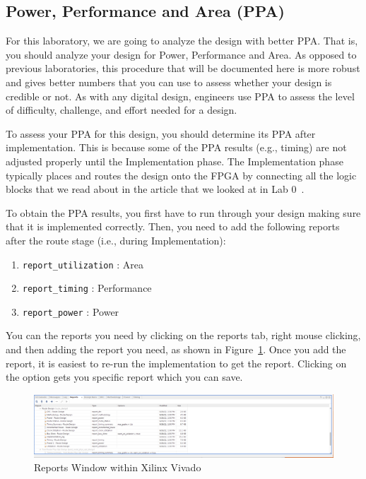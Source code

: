 \documentclass{article}
\begin{document}
\subsection{Power, Performance and Area (PPA)}

For this laboratory, we are going to analyze the design with better
PPA.  That is, you should analyze your design for Power, Performance
and Area.  As opposed to previous laboratories, this procedure that
will be documented here is more robust and gives better numbers that
you can use to assess whether your design is credible or not.  As with
any digital design, engineers use PPA to assess the level of
difficulty, challenge, and effort needed for a design.

To assess your PPA for this design, you should determine its PPA after
implementation.  This is because some of the PPA results (e.g.,
timing) are not adjusted properly until the Implementation phase.  The
Implementation phase typically places and routes the design onto the
FPGA by connecting all the logic blocks that we read about in the
article that we looked at in Lab 0~\cite{7086413}.

To obtain the PPA results, you first have to run through your design
making sure that it is implemented correctly.  Then, you need to add
the following reports after the route stage (i.e., during
Implementation):
\begin{enumerate}
\item \verb!report_utilization! : Area
\item \verb!report_timing! : Performance
\item \verb!report_power! : Power
\end{enumerate}
You can the reports you need by clicking on the reports tab, right
mouse clicking, and then adding the report you need, as shown in
Figure~\ref{reports1.png}.  Once you add the report, it is easiest to
re-run the implementation to get the report.  Clicking on the option
gets you specific report which you can save.
\begin{figure} [b!]
  \centering
  \includegraphics[scale=0.3, width=\columnwidth]{analysis.png}
  \caption{Reports Window within Xilinx Vivado}
  \label{reports1.png}
\end{figure}
\end{document}
